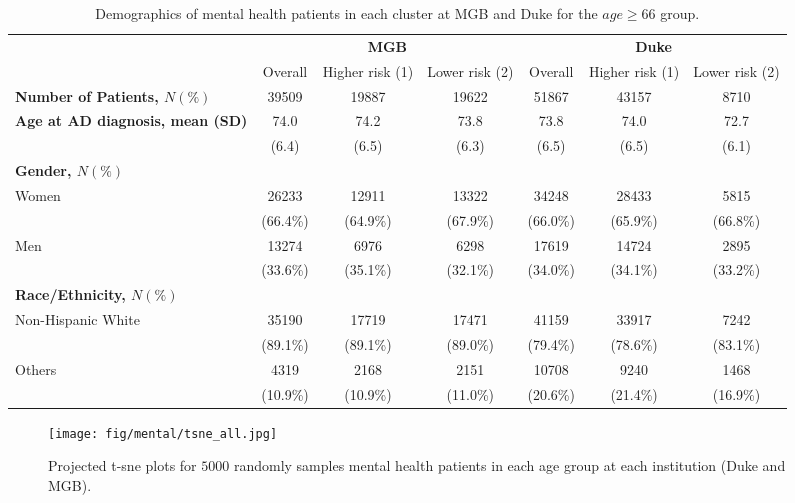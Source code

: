 \documentclass{article}
\begin{document}
\begin{table}[H]
    \centering
    \scriptsize
    \begin{tabular}{l c c c c c c}
\toprule
& \multicolumn{3}{c}{\textbf{MGB}}&
\multicolumn{3}{c}{\textbf{Duke}}\\
\cmidrule(r){2-4}\cmidrule(l){5-7}
& Overall & Higher risk (1) & Lower risk (2) & Overall & Higher risk (1) & Lower risk (2)  \\
\bottomrule
\textbf{Number of Patients, $N(\%)$} & 39509 & 19887 & 19622 & 51867 & 43157 & 8710 \\
\bottomrule
\textbf{Age at AD diagnosis, mean (SD)} & 74.0 & 74.2 & 73.8 & 73.8 & 74.0 & 72.7 \\
 & (6.4) & (6.5) & (6.3) & (6.5) & (6.5) & (6.1) \\
\bottomrule
\textbf{Gender, $N(\%)$}\\
Women & 26233 & 12911 & 13322 & 34248 & 28433 & 5815 \\
 & (66.4\%) & (64.9\%) & (67.9\%) & (66.0\%) & (65.9\%) & (66.8\%) \\
Men & 13274 & 6976 & 6298 & 17619 & 14724 & 2895 \\
 & (33.6\%) & (35.1\%) & (32.1\%) & (34.0\%) & (34.1\%) & (33.2\%) \\
\bottomrule
\textbf{Race/Ethnicity, $N(\%)$} \\
Non-Hispanic White & 35190 & 17719 & 17471 & 41159 & 33917 & 7242 \\
 & (89.1\%) & (89.1\%) & (89.0\%) & (79.4\%) & (78.6\%) & (83.1\%) \\
Others & 4319 & 2168 & 2151 & 10708 & 9240 & 1468 \\
 & (10.9\%) & (10.9\%) & (11.0\%) & (20.6\%) & (21.4\%) & (16.9\%) \\
\bottomrule
\end{tabular}
\caption{Demographics of mental health patients in each cluster at MGB and Duke for the $age \ge 66$ group.}
\label{tab:mental_demo_66-110}
\end{table}

\begin{figure}[H]
    \centering
    \texttt{[image: fig/mental/tsne\_all.jpg]}
    \caption{Projected t-sne plots for $5000$ randomly samples mental health patients in each age group at each institution (Duke and MGB).}
    \label{fig:suicide_tsne}
\end{figure}
\end{document}
